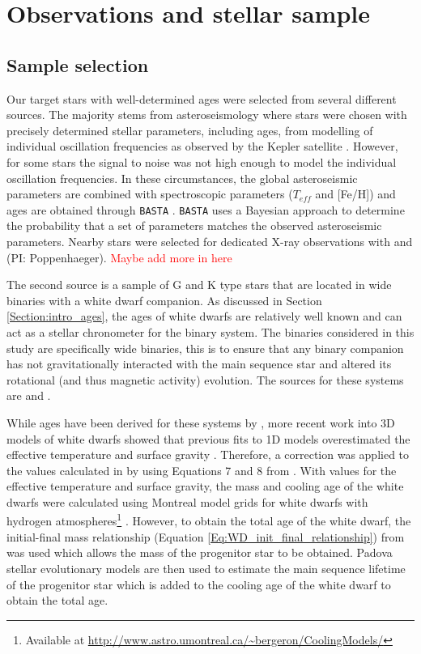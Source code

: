 \section{Observations and stellar sample}
\subsection{Sample selection}
\label{Section_sample_selection}
Our target stars with well-determined ages were selected from several different sources. The majority stems from asteroseismology where stars were chosen with precisely determined stellar parameters, including ages, from modelling of individual oscillation frequencies as observed by the Kepler satellite \citep{Silva_Aguirre_etal_2015,Silva_Aguirre_etal_2017}. However, for some stars the signal to noise was not high enough to model the individual oscillation frequencies. In these circumstances, the global asteroseismic parameters \citep{Chaplin_etal_2014} are combined with spectroscopic parameters ($T_{eff}$ and [Fe/H]) \citep{Buchhave_Latham_2015} and ages are obtained through \texttt{BASTA} \citep{Silva_Aguirre_etal_2015}. \texttt{BASTA} uses a Bayesian approach to determine the probability that a set of parameters matches the observed asteroseismic parameters. Nearby stars were selected for dedicated X-ray observations with \XMM and \Chandra (PI: Poppenhaeger).
\textcolor{red}{Maybe add more in here}

The second source is a sample of G and K type stars that are located in wide binaries with a white dwarf companion. As discussed in Section \ref{Section:intro_ages}, the ages of white dwarfs are relatively well known and can act as a stellar chronometer for the binary system. The binaries considered in this study are specifically wide binaries, this is to ensure that any binary companion has not gravitationally interacted with the main sequence star and altered its rotational (and thus magnetic activity) evolution. The sources for these systems are \citet{Garces_etal_2011} and \citet{Zhao_etal_2012}.

While ages have been derived for these systems by \citet{Garces_etal_2011}, more recent work into 3D models of white dwarfs showed that previous fits to 1D models overestimated the effective temperature and surface gravity \citep{Tremblay_etal_2013}. Therefore, a correction was applied to the values calculated in \citet{Garces_etal_2011} by using Equations 7 and 8 from \citet{Tremblay_etal_2013}. With values for the effective temperature and surface gravity, the mass and cooling age of the white dwarfs were calculated using Montreal model grids for white dwarfs with hydrogen atmospheres\footnote{Available at \url{http://www.astro.umontreal.ca/~bergeron/CoolingModels/}} \citep{Holberg_Bergeron_2006,Kowalski_Saumon_2006,Bergeron_etal_2011,Tremblay_etal_2011}. However, to obtain the total age of the white dwarf, the initial-final mass relationship (Equation \ref{Eq:WD_init_final_relationship}) from \citet{Kalirai_etal_2008} was used which allows the mass of the progenitor star to be obtained. Padova stellar evolutionary models \citep{Bertelli_etal_2008} are then used to estimate the main sequence lifetime of the progenitor star which is added to the cooling age of the white dwarf to obtain the total age.


